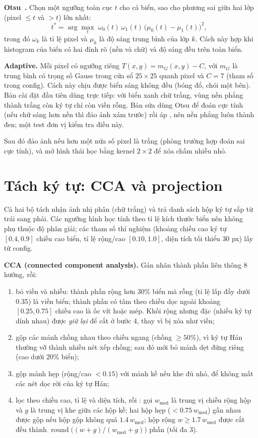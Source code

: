 \textbf{Otsu~\cite{otsu}.} Chọn một ngưỡng toàn cục $t$ cho cả biển, sao cho phương sai giữa hai lớp (pixel $\le t$ và $>t$) lớn nhất:
\[
t^{*}=\arg\max_{t}\;\omega_0(t)\,\omega_1(t)\,\big(\mu_0(t)-\mu_1(t)\big)^2,
\]
trong đó $\omega_k$ là tỉ lệ pixel và $\mu_k$ là độ sáng trung bình của lớp $k$. Cách này hợp khi histogram của biển có hai đỉnh rõ (nền và chữ) và độ sáng đều trên toàn biển.

\textbf{Adaptive.} Mỗi pixel có ngưỡng riêng $T(x,y)=m_G(x,y)-C$, với $m_G$ là trung bình có trọng số Gauss trong cửa sổ $25\times 25$ quanh pixel và $C=7$ (tham số  trong config). Cách này chịu được biển sáng không đều (bóng đổ, chói một bên). Bản cài đặt đầu tiên dùng  trực tiếp: với biển xanh chữ trắng, vùng nền phẳng thành trắng còn ký tự chỉ còn viền rỗng. Bản sửa dùng Otsu để đoán cực tính (nếu chữ sáng hơn nền thì đảo ảnh xám trước) rồi áp , nên nền phẳng luôn thành đen; một test đơn vị kiểm tra điều này.

Sau đó  đảo ảnh nếu hơn một nửa số pixel là trắng (phòng trường hợp đoán sai cực tính), và  mở hình thái học bằng kernel $2\times 2$ để xóa chấm nhiễu nhỏ.

\section{Tách ký tự: CCA và projection}
\label{sec:segment}

Cả hai bộ tách nhận ảnh nhị phân (chữ trắng) và trả danh sách hộp ký tự sắp từ trái sang phải. Các ngưỡng hình học tính theo tỉ lệ kích thước biển nên không phụ thuộc độ phân giải; các tham số thí nghiệm (khoảng chiều cao ký tự $[0.4,0.9]$ chiều cao biển, tỉ lệ rộng/cao $[0.10,1.0]$, diện tích tối thiểu 30 px) lấy từ config.

\textbf{CCA (connected component analysis).} Gán nhãn thành phần liên thông 8 hướng, rồi:
{\sloppy
\begin{enumerate}
  \item bỏ viền và nhiễu: thành phần rộng hơn 30\% biển mà rỗng (tỉ lệ lấp đầy dưới 0.35) là viền biển; thành phần có tâm theo chiều dọc ngoài khoảng $[0.25,0.75]$ chiều cao là ốc vít hoặc mép. Khối rộng nhưng đặc (nhiều ký tự dính nhau) được \emph{giữ lại} để cắt ở bước 4, thay vì bị xóa như viền;
  \item gộp các mảnh chồng nhau theo chiều ngang (chồng $\ge 50\%$), vì ký tự Hán thường vỡ thành nhiều nét xếp chồng; sau đó mới bỏ mảnh dẹt đứng riêng (cao dưới 20\% biển);
  \item gộp mảnh hẹp (rộng/cao $<0.15$) với mảnh kề nếu khe đủ nhỏ, để không mất các nét dọc rời của ký tự Hán;
  \item lọc theo chiều cao, tỉ lệ và diện tích, rồi : gọi $w_{\mathrm{med}}$ là trung vị chiều rộng hộp và $g$ là trung vị khe giữa các hộp kề; hai hộp hẹp ($<0.75\,w_{\mathrm{med}}$) gần nhau được gộp nếu hộp gộp không quá $1.4\,w_{\mathrm{med}}$; hộp rộng $w\ge 1.7\,w_{\mathrm{med}}$ được cắt đều thành $\operatorname{round}\big((w+g)/(w_{\mathrm{med}}+g)\big)$ phần (tối đa 3).
\end{enumerate}
\par}


